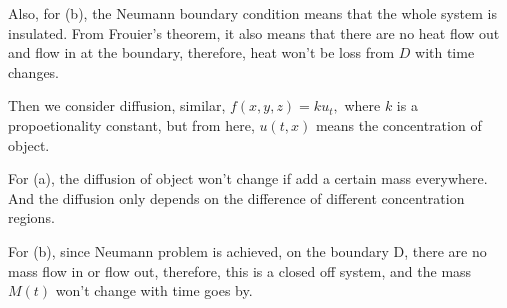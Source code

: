 \documentclass{article}
\begin{document}
		Also, for (b), the Neumann boundary condition means that the whole system is insulated. From Frouier's theorem, it also means that there are no heat flow out and flow in at the boundary, therefore, heat won't be loss from $D$ with time changes.

		Then we consider diffusion, similar, $f(x,y,z)=ku_{t},$ where $k$ is a propoetionality constant, but from here, $u(t,x)$ means the concentration of object.
		
		For (a), the diffusion of object won't change if add a certain mass everywhere. And the diffusion only depends on the difference of different concentration regions.

		For (b), since Neumann problem is achieved, on the boundary D, there are no mass flow in or flow out, therefore, this is a closed off system, and the mass $M(t)$ won't change with time goes by.  
\end{document}
